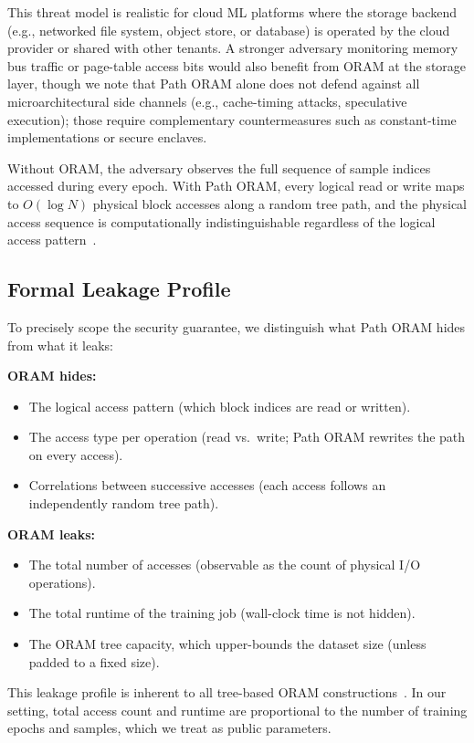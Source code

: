 \documentclass[11pt]{article}
\begin{document}
This threat model is realistic for cloud ML platforms where the storage backend (e.g., networked file system, object store, or database) is operated by the cloud provider or shared with other tenants.
A stronger adversary monitoring memory bus traffic or page-table access bits would also benefit from ORAM at the storage layer, though we note that Path ORAM alone does not defend against all microarchitectural side channels (e.g., cache-timing attacks, speculative execution); those require complementary countermeasures such as constant-time implementations or secure enclaves.

Without ORAM, the adversary observes the full sequence of sample indices accessed during every epoch.
With Path ORAM, every logical read or write maps to $O(\log N)$ physical block accesses along a random tree path, and the physical access sequence is computationally indistinguishable regardless of the logical access pattern~\cite{stefanov2013}.

\subsection{Formal Leakage Profile}

To precisely scope the security guarantee, we distinguish what Path ORAM hides from what it leaks:

\medskip
\noindent\textbf{ORAM hides:}
\begin{itemize}[nosep]
    \item The logical access pattern (which block indices are read or written).
    \item The access type per operation (read vs.\ write; Path ORAM rewrites the path on every access).
    \item Correlations between successive accesses (each access follows an independently random tree path).
\end{itemize}

\noindent\textbf{ORAM leaks:}
\begin{itemize}[nosep]
    \item The total number of accesses (observable as the count of physical I/O operations).
    \item The total runtime of the training job (wall-clock time is not hidden).
    \item The ORAM tree capacity, which upper-bounds the dataset size (unless padded to a fixed size).
\end{itemize}

\noindent This leakage profile is inherent to all tree-based ORAM constructions~\cite{goldreich1996,stefanov2013}.
In our setting, total access count and runtime are proportional to the number of training epochs and samples, which we treat as public parameters.
\end{document}
